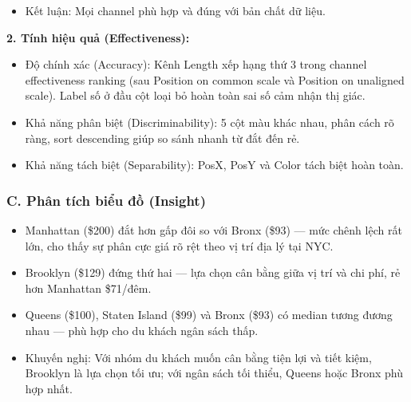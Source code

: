\begin{itemize}
\begin{itemize}
        \item Ưu tiên 3 -- Màu sắc (Color Hue --- redundant encoding): Color Hue mã hóa Borough (Categorical) --- cùng thuộc tính đã được mã hóa bởi PosX. Đây là redundant encoding có chủ ý: mặc dù không bổ sung thêm thông tin mới, kỹ thuật này tăng cường tính nhận diện trực quan, giúp người xem liên kết màu sắc với borough ngay cả khi nhìn vào legend hoặc kết hợp với các chart khác trong dashboard. Theo Mackinlay, Color Hue phù hợp cho dữ liệu danh mục và không gây hiểu nhầm về thứ tự hay mức độ.
    \end{itemize}
    \item Kết luận: Mọi channel phù hợp và đúng với bản chất dữ liệu.
\end{itemize}

\textbf{2. Tính hiệu quả (Effectiveness):}

\begin{itemize}
    \item Độ chính xác (Accuracy): Kênh Length xếp hạng thứ 3 trong channel effectiveness ranking (sau Position on common scale và Position on unaligned scale). Label số ở đầu cột loại bỏ hoàn toàn sai số cảm nhận thị giác.
    \item Khả năng phân biệt (Discriminability): 5 cột màu khác nhau, phân cách rõ ràng, sort descending giúp so sánh nhanh từ đắt đến rẻ.
    \item Khả năng tách biệt (Separability): PosX, PosY và Color tách biệt hoàn toàn.
\end{itemize}

\subsubsection*{C. Phân tích biểu đồ (Insight)}

\begin{itemize}
    \item Manhattan (\$200) đắt hơn gấp đôi so với Bronx (\$93) --- mức chênh lệch rất lớn, cho thấy sự phân cực giá rõ rệt theo vị trí địa lý tại NYC.
    \item Brooklyn (\$129) đứng thứ hai --- lựa chọn cân bằng giữa vị trí và chi phí, rẻ hơn Manhattan \$71/đêm.
    \item Queens (\$100), Staten Island (\$99) và Bronx (\$93) có median tương đương nhau --- phù hợp cho du khách ngân sách thấp.
    \item Khuyến nghị: Với nhóm du khách muốn cân bằng tiện lợi và tiết kiệm, Brooklyn là lựa chọn tối ưu; với ngân sách tối thiểu, Queens hoặc Bronx phù hợp nhất.
\end{itemize}
